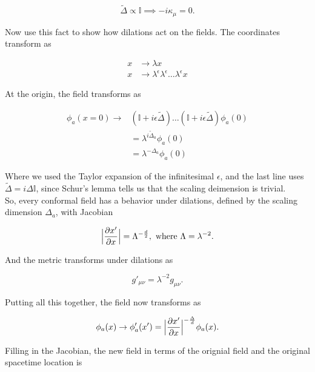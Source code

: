 \begin{equation}
\tilde{\Delta} \propto \mathbb{I} \implies -i \kappa_\mu = 0.
\end{equation}

\noindent Now use this fact to show how dilations act on the fields. The coordinates transform as

\begin{align}
x &\rightarrow \lambda x \\
x &\rightarrow \lambda^\epsilon \lambda^\epsilon \dots \lambda^\epsilon x
\end{align}

\noindent At the origin, the field transforms as

\begin{align}
\phi_a (x=0) \rightarrow&  (\mathbb{I} + i \epsilon \tilde{\Delta}) \dots (\mathbb{I} + i \epsilon \tilde{\Delta}) \phi_a (0) \\
&= \lambda^{i \tilde{\Delta}_a} \phi_a (0) \\
&= \lambda^{-\Delta_a} \phi_a (0)
\end{align}


\noindent Where we used the Taylor expansion of the infinitesimal $\epsilon$, and the last line uses $\tilde{\Delta} = i \Delta \mathbb{I}$, since Schur's lemma tells us that the scaling deimension is trivial. \\

\noindent So, every conformal field has a behavior under dilations, defined by the scaling dimension $\Delta_a$, with Jacobian

\begin{equation}
\Big{|} \frac{\partial x'}{\partial x} \Big{|} = \Lambda^{-\frac{d}{2}}, \text{ where } \Lambda = \lambda^{-2}.
\end{equation}

\noindent And the metric transforms under dilations as

\begin{equation}
g'_{\mu\nu} = \lambda^{-2} g_{\mu\nu}.
\end{equation}

\noindent Putting all this together, the field now transforms as 

\begin{equation}
\phi_a (x) \rightarrow \phi'_a (x') = \Big{|} \frac{\partial x'}{\partial x} \Big{|}^{-\frac{\Delta}{d}} \phi_a (x).
\end{equation}

\noindent Filling in the Jacobian, the new field in terms of the orignial field and the original spacetime location is

